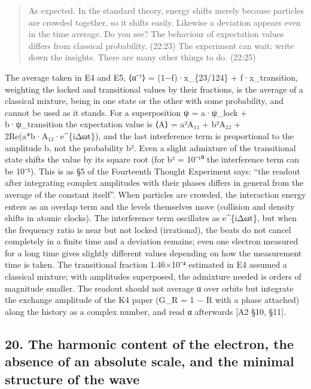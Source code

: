 \documentclass[
  a4paper,
]{article}
\begin{document}
\begin{quote}
As expected. In the standard theory, energy shifts merely because
particles are crowded together, so it shifts easily. Likewise a
deviation appears even in the time average. Do you see? The behaviour of
expectation values differs from classical probability. (22:23) The
experiment can wait; write down the insights. There are many other
things to do. (22:25)
\end{quote}

The average taken in E4 and E5, ⟨α⁻¹⟩ = (1−f)·x\_\{23/124\} +
f·x\_transition, weighting the locked and transitional values by their
fractions, is the average of a classical mixture, being in one state or
the other with some probability, and cannot be used as it stands. For a
superposition ψ = a·ψ\_lock + b·ψ\_transition the expectation value is
⟨A⟩ = \textbar a\textbar²A₁₁ + \textbar b\textbar²A₂₂ +
2Re(a*b·A₁₂·e\^{}\{iΔωt\}), and the last interference term is
proportional to the amplitude b, not the probability
\textbar b\textbar². Even a slight admixture of the transitional state
shifts the value by its square root (for \textbar b\textbar² = 10⁻¹⁰ the
interference term can be 10⁻⁵). This is as §5 of the Fourteenth Thought
Experiment says: ``the readout after integrating complex amplitudes with
their phases differs in general from the average of the constant
itself''. When particles are crowded, the interaction energy enters as
an overlap term and the levels themselves move (collision and density
shifts in atomic clocks). The interference term oscillates as
e\^{}\{iΔωt\}, but when the frequency ratio is near but not locked
(irrational), the beats do not cancel completely in a finite time and a
deviation remains; even one electron measured for a long time gives
slightly different values depending on how the measurement time is
taken. The transitional fraction 1.46×10⁻⁴ estimated in E4 assumed a
classical mixture; with amplitudes superposed, the admixture needed is
orders of magnitude smaller. The readout should not average α over
orbits but integrate the exchange amplitude of the K4 paper (G\_R = 1 −
R with a phase attached) along the history as a complex number, and read
α afterwards {[}A2 §10, §11{]}.

\subsection{20. The harmonic content of the electron, the absence of an
absolute scale, and the minimal structure of the
wave}\label{the-harmonic-content-of-the-electron-the-absence-of-an-absolute-scale-and-the-minimal-structure-of-the-wave}
\end{document}
